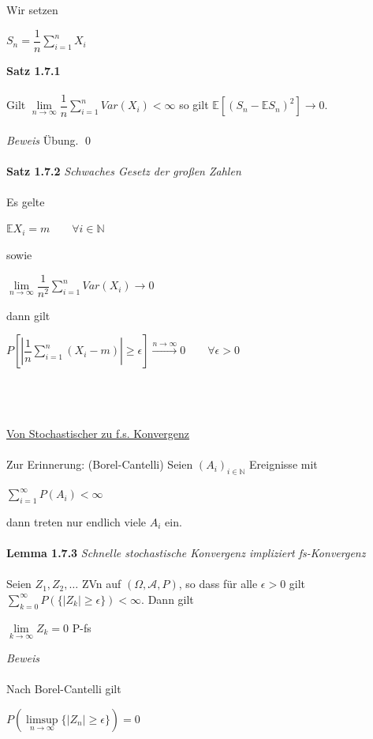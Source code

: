 \documentclass[10pt,a4paper]{report}
\numberwithin{equation}{section}
\numberwithin{figure}{section}
\theoremstyle{plain}
\theoremstyle{definition}
\theoremstyle{plain}
\theoremstyle{definition}
\theoremstyle{remark}
\theoremstyle{plain}
\theoremstyle{plain}
\theoremstyle{plain}
\newcommand{\1}{ \mathbb{1} } %
\begin{document}
Wir setzen
\begin{center}
$S_n=\dfrac{1}{n}\sum\limits_{i=1}^nX_i$
\end{center}
\textbf{Satz 1.7.1}\\\\
Gilt $\lim\limits_{n \to \infty} \dfrac{1}{n}\sum\limits_{i=1}^nVar(X_i)<\infty$ so gilt $\mathbb{E}[(S_n-\mathbb{E}S_n)^2]\to 0$.\\\\
\textit{Beweis} Übung. \qed\\\\
\textbf{Satz 1.7.2} \textit{Schwaches Gesetz der großen Zahlen}\\\\
Es gelte 
\begin{center}
$\mathbb{E}X_i=m\qquad \forall i \in \mathbb{N}$
\end{center}
sowie
\begin{center}
$\lim\limits_{n \to \infty} \dfrac{1}{n^2}\sum\limits_{i=1}^nVar(X_i) \to 0$
\end{center}
dann gilt
\begin{center}
$P\left[\left|\dfrac{1}{n}\sum\limits_{i=1}^n(X_i-m)\right|\geq \epsilon\right] \overset{n \to \infty}{\to} 0 \qquad \forall \epsilon >0$
\end{center}
$ $\\\\\\
\underline{Von Stochastischer zu f.s. Konvergenz}\\\\
Zur Erinnerung: (Borel-Cantelli) Seien $(A_i)_{i \in \mathbb{N}}$ Ereignisse mit
\begin{center}
$\sum\limits_{i=1}^\infty P(A_i) < \infty $
\end{center} 
dann treten nur endlich viele $A_i$ ein.\\\\
\textbf{Lemma 1.7.3} \textit{Schnelle stochastische Konvergenz impliziert fs-Konvergenz}\\\\
Seien  $Z_1, Z_2,\ldots$  ZVn auf $(\Omega,\mathcal{A},P)$, so dass für alle $\epsilon >0$ gilt $\sum\limits_{k=0}^\infty P(\{|Z_k|\geq \epsilon\})< \infty $. Dann gilt
\begin{center}
$\lim\limits_{k \to \infty} Z_k=0$ P-fs
\end{center}
\textit{Beweis}\\\\
Nach Borel-Cantelli gilt
\begin{center}
$P\left(\limsup\limits_{n \to \infty}\{|Z_n|\geq \epsilon\}\right)=0$
\end{center}
\end{document}
